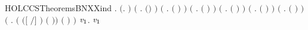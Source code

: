 \newcommand{\HOLCCSTheoremsBNXXdef}{\UseVerbatim{HOLCCSTheoremsBNXXdef}}
\begin{SaveVerbatim}{HOLCCSTheoremsBNXXind}
\HOLTokenTurnstile{} \HOLSymConst{\HOLTokenForall{}}.
       \ensuremath{(}\HOLSymConst{\HOLTokenForall{}}.   \ensuremath{)} \HOLSymConst{\HOLTokenConj{}} \ensuremath{(}\HOLSymConst{\HOLTokenForall{}}  .    \HOLSymConst{\HOLTokenImp{}}  \ensuremath{(}\HOLSymConst{\ensuremath{\ldotp}}\ensuremath{)} \ensuremath{)} \HOLSymConst{\HOLTokenConj{}}
       \ensuremath{(}\HOLSymConst{\HOLTokenForall{}}  .    \HOLSymConst{\HOLTokenConj{}}    \HOLSymConst{\HOLTokenImp{}}  \ensuremath{(} \HOLSymConst{\ensuremath{+}} \ensuremath{)} \ensuremath{)} \HOLSymConst{\HOLTokenConj{}}
       \ensuremath{(}\HOLSymConst{\HOLTokenForall{}}  .    \HOLSymConst{\HOLTokenConj{}}    \HOLSymConst{\HOLTokenImp{}}  \ensuremath{(} \HOLSymConst{\ensuremath{\mid}} \ensuremath{)} \ensuremath{)} \HOLSymConst{\HOLTokenConj{}}
       \ensuremath{(}\HOLSymConst{\HOLTokenForall{}}  .    \HOLSymConst{\HOLTokenImp{}}  \ensuremath{(}  \ensuremath{)} \ensuremath{)} \HOLSymConst{\HOLTokenConj{}}
       \ensuremath{(}\HOLSymConst{\HOLTokenForall{}}  .    \HOLSymConst{\HOLTokenImp{}}  \ensuremath{(}  \ensuremath{)} \ensuremath{)} \HOLSymConst{\HOLTokenConj{}}
       \ensuremath{(}\HOLSymConst{\HOLTokenForall{}} .  \ensuremath{(} \ensuremath{)} \ensuremath{)} \HOLSymConst{\HOLTokenConj{}}
       \ensuremath{(}\HOLSymConst{\HOLTokenForall{}}  .
            \ensuremath{(}   \HOLSymConst{\HOLTokenImp{}}  \ensuremath{(}\ensuremath{[}  \ensuremath{/}\ensuremath{]} \ensuremath{)} \ensuremath{(}  \ensuremath{)}\ensuremath{)} \HOLSymConst{\HOLTokenImp{}}
             \ensuremath{(}  \ensuremath{)} \ensuremath{)} \HOLSymConst{\HOLTokenImp{}}
       \HOLSymConst{\HOLTokenForall{}} \ensuremath{\HOLBoundVar{v}\sb{\mathrm{1}}}.   \ensuremath{\HOLBoundVar{v}\sb{\mathrm{1}}}
\end{SaveVerbatim}
